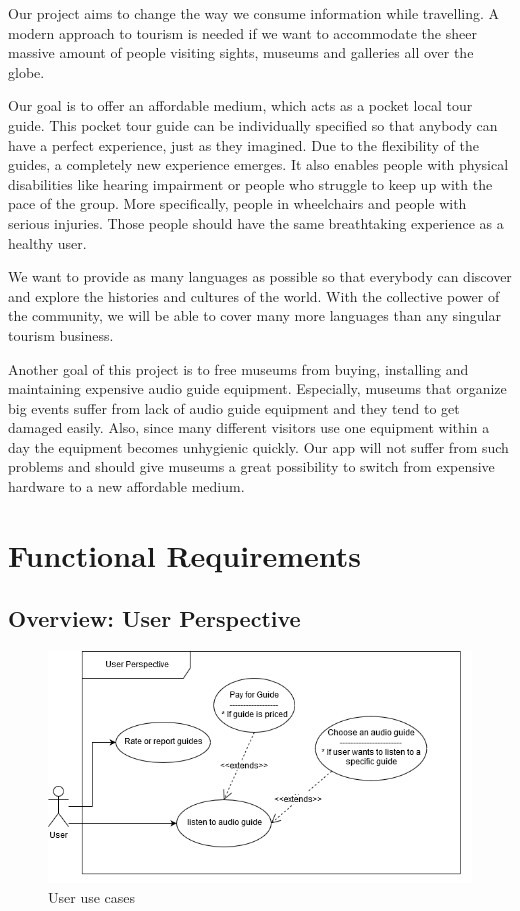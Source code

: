 \documentclass[12pt]{article}
\theoremstyle{definition}
\newenvironment{text}{
   \setlength{\parindent}{0pt}
   \color{black}
}{}
\begin{document}
\begin{text}
Our project aims to change the way we consume information while travelling. A modern approach to tourism is needed if we want to accommodate the sheer massive amount of people visiting sights, museums and galleries all over the globe. 

Our goal is to offer an affordable medium, which acts as a pocket local tour guide. This pocket tour guide can be individually specified so that anybody can have a perfect experience, just as they imagined. Due to the flexibility of the guides, a completely new experience emerges. It also enables people with physical disabilities like hearing impairment or people who struggle to keep up with the pace of the group. More specifically, people in wheelchairs and people with serious injuries. Those people should have the same breathtaking experience as a healthy user.

We want to provide as many languages as possible so that everybody can discover and explore the histories and cultures of the world. With the collective power of the community, we will be able to cover many more languages than any singular tourism business.

Another goal of this project is to free museums from buying, installing and maintaining expensive audio guide equipment. Especially, museums that organize big events suffer from lack of audio guide equipment and they tend to get damaged easily. Also, since many different visitors use one equipment within a day the equipment becomes unhygienic quickly. Our app will not suffer from such problems and should give museums a great possibility to switch from expensive hardware to a new affordable medium.
\end{text}

\pagebreak

\section{Functional Requirements}

\subsection{Overview: User Perspective}
\begin{figure}[hbt!]
    \centering
    \includegraphics[width=0.9\linewidth]{UseCases/UserUseCase.png}
    \caption{User use cases}
    \label{fig:overview1}
\end{figure}
\end{document}
